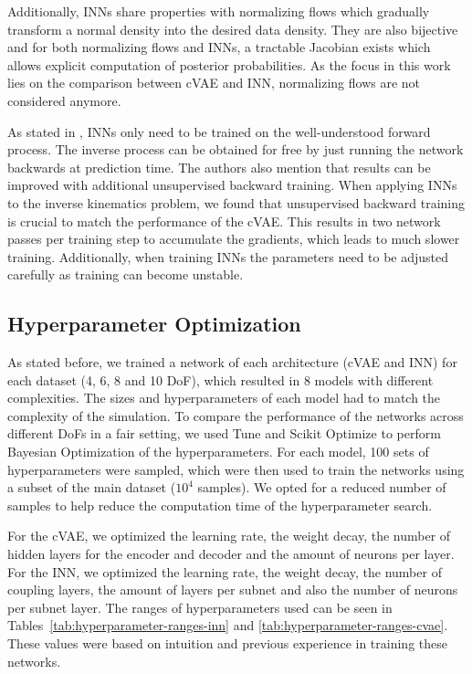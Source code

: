 \documentclass[conference]{IEEEtran}
\begin{document}
Additionally, INNs share properties with normalizing flows \cite{normalizingFlows2010, normalizingFlows2013} which gradually transform a normal density into the desired data density. They are also bijective and for both normalizing flows and INNs, a tractable Jacobian exists which allows explicit computation of posterior probabilities. As the focus in this work lies on the comparison between cVAE and INN, normalizing flows are not considered anymore.

As stated in \cite{Ardizzone2018}, INNs only need to be trained on the well-understood forward process. The inverse process can be obtained for free by just running the network backwards at prediction time. The authors also mention that results can be improved with additional unsupervised backward training. When applying INNs to the inverse kinematics problem, we found that unsupervised backward training is crucial to match the performance of the cVAE. This results in two network passes per training step to accumulate the gradients, which leads to much slower training. Additionally, when training INNs the parameters need to be adjusted carefully as training can become unstable.

\subsection*{Hyperparameter Optimization}

As stated before, we trained a network of each architecture (cVAE and INN) for each dataset (4, 6, 8 and 10 DoF), which resulted in 8 models with different complexities. The sizes and hyperparameters of each model had to match the complexity of the simulation. To compare the performance of the networks across different DoFs in a fair setting, we used Tune \cite{liaw2018tune} and Scikit Optimize \cite{scikit-optimize} to perform Bayesian Optimization of the hyperparameters. For each model, 100 sets of hyperparameters were sampled, which were then used to train the networks using a subset of the main dataset (\( 10^4 \) samples). We opted for a reduced number of samples to help reduce the computation time of the hyperparameter search. 

For the cVAE, we optimized the learning rate, the weight decay, the number of hidden layers for the encoder and decoder and the amount of neurons per layer. For the INN, we optimized the learning rate, the weight decay, the number of coupling layers, the amount of layers per subnet and also the number of neurons per subnet layer. The ranges of hyperparameters used can be seen in Tables~\ref{tab:hyperparameter-ranges-inn} and \ref{tab:hyperparameter-ranges-cvae}. These values were based on intuition and previous experience in training these networks.
\end{document}
